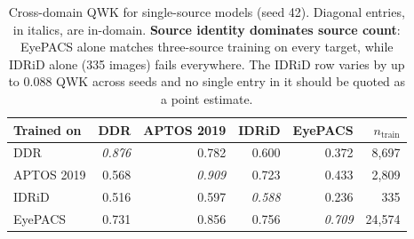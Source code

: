 \begin{table}[t]
\centering
\caption{Cross-domain QWK for single-source models (seed 42). Diagonal entries, in italics, are in-domain. \textbf{Source identity dominates source count}: EyePACS alone matches three-source training on every target, while IDRiD alone (335 images) fails everywhere. The IDRiD row varies by up to 0.088 QWK across seeds and no single entry in it should be quoted as a point estimate.}
\label{tab:matrix}
\begin{tabular}{lrrrrr}
\toprule
Trained on & DDR & APTOS 2019 & IDRiD & EyePACS & $n_{\text{train}}$ \\
\midrule
DDR & \textit{0.876} & 0.782 & 0.600 & 0.372 & 8,697 \\
APTOS 2019 & 0.568 & \textit{0.909} & 0.723 & 0.433 & 2,809 \\
IDRiD & 0.516 & 0.597 & \textit{0.588} & 0.236 & 335 \\
EyePACS & 0.731 & 0.856 & 0.756 & \textit{0.709} & 24,574 \\
\bottomrule
\end{tabular}
\end{table}